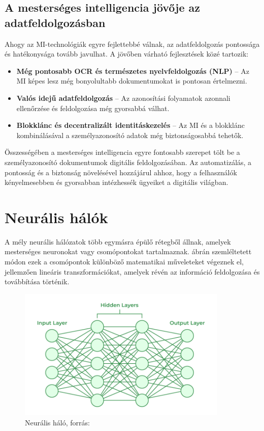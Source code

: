 \documentclass[
]{thesis-ekf}
\theoremstyle{definition}
\theoremstyle{remark}
\begin{document}
	\section{A mesterséges intelligencia jövője az adatfeldolgozásban}
	Ahogy az MI-technológiák egyre fejlettebbé válnak, az adatfeldolgozás pontossága és hatékonysága tovább javulhat. A jövőben várható fejlesztések közé tartozik:
	\begin{itemize}
		\item \textbf{Még pontosabb OCR és természetes nyelvfeldolgozás (NLP)} -- Az MI képes lesz még bonyolultabb dokumentumokat is pontosan értelmezni.
		\item \textbf{Valós idejű adatfeldolgozás} -- Az azonosítási folyamatok azonnali ellenőrzése és feldolgozása még gyorsabbá válhat.
		\item \textbf{Blokklánc és decentralizált identitáskezelés} -- Az MI és a blokklánc kombinálásával a személyazonosító adatok még biztonságosabbá tehetők.
	\end{itemize}
	Összességében a mesterséges intelligencia egyre fontosabb szerepet tölt be a személyazonosító dokumentumok digitális feldolgozásában. Az automatizálás, a pontosság és a biztonság növelésével hozzájárul ahhoz, hogy a felhasználók kényelmesebben és gyorsabban intézhessék ügyeiket a digitális világban.
	
	\chapter{Neurális hálók}
	
	A mély neurális hálózatok több egymásra épülő rétegből állnak, amelyek mesterséges neuronokat vagy csomópontokat tartalmaznak.  ábrán szemléltetett módon ezek a csomópontok különböző matematikai műveleteket végeznek el, jellemzően lineáris transzformációkat, amelyek révén az információ feldolgozása és továbbítása történik.
	
	\begin{figure}
		\centering
		\includegraphics[width=10cm]{Neural-Networks-Architecture}
		\caption{Neurális háló, forrás: \cite{neuralNetworkImage}}
		\label{fig-neural}
	\end{figure}
	
\end{document}
